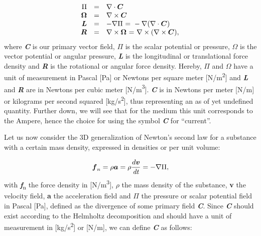 \documentclass[a4paper]{article}
\newcommand\textstyleNone[1]{#1}
\newcounter{Text}
\newcommand\boldsubformula[1]{\text{\mathversion{bold}$#1$}}
\begin{document}
\begin{equation}\label{seq:refText15}
\begin{matrix}\hfill \Pi &=&\nabla \cdot \boldsubformula C\hfill\null \\\hfill \boldsubformula{\Omega }&=&\nabla \times
\boldsubformula C\hfill\null \\\hfill \boldsubformula L&=&-\nabla \Pi \text{ = }-\nabla (\nabla \cdot \boldsubformula
C)\hfill\null \\\hfill \boldsubformula R&=&\nabla \times \boldsubformula{\Omega }\text{ = }\nabla \times (\nabla \times
\boldsubformula C),\hfill\null \end{matrix}
\end{equation}
{
\textstyleNone{{where
}\textbf{\textit{{C}}}{
}{is }{our
primary vector field}{,
}}\href{https://en.wikipedia.org/wiki/Pi_(letter)}{\textstyleNone{\textit{{$\Pi
$}}}}\textstyleNone{{ is
}{the}{ scalar
potential
}{or}{
pressure, }\textbf{\textit{{$\Omega $
}}}}{is the vector potential or angular pressure,
}\textbf{\textit{{L}}}{
is the longitudinal or translational force density and
}\textbf{\textit{{R}}}{
is the rotational or angular force density. Hereby,
}\href{https://en.wikipedia.org/wiki/Pi_(letter)}{\textstyleNone{\textit{{$\Pi
$}}}}\textstyleNone{{
}{and
}\textbf{\textit{{$\Omega
$}}}\textbf{\textit{{
}}}{have a unit of measurement in Pascal [Pa] or Newtons per square
meter
[N/m}{\textsuperscript{2}}{]
and
}\textbf{\textit{{L}}}{
and
}\textbf{\textit{{R}}}{
are in Newtons per cubic meter
[N/m}{\textsuperscript{3}}{].
}\textbf{\textit{{C}}}{
is in Newtons per meter [N/m] or kilograms per second squared
[kg/s}{\textsuperscript{2}}{],
thus representing an as of yet undefined quantity. }{Further down,
we will see that for the medium this unit corresponds to the Ampere, hence the choice for using the symbol
}\textbf{\textit{{C}}}{
}{for ``current''.}}}

{
\textstyleNone{{Let us now
}{consider
}{the 3D generalization of
}{Newton's second law
}{for a
}{substance}{
with a certain mass density}{, expressed in densities or per unit
volume:}}}

\begin{equation}
\boldsubformula f_n=\rho \boldsubformula a=\rho \frac{d\boldsubformula v}{\mathit{dt}}=-{\nabla}\Pi ,
\end{equation}
{
\textstyleNone{{with
}\textbf{\textit{{f}}}{\textsubscript{n}}{
}{the}{ force
density in
[N/m}{\textsuperscript{3}}{],}{
$\rho $ the mass density of the
}{substance}{,
}\textbf{{v}}{
the velocity field,
}\textbf{{a}}{
the acceleration field }{and $\Pi
$}{ the pressure
}{or}{ scalar
}potential field in Pascal [Pa], defined as the divergence of some primary field \textbf{\textit{C}}. Since
\textbf{\textit{C}} should exist according to the Helmholtz decomposition and should have a unit of measurement in
}[kg/s\textsuperscript{2}] or [N/m], we can define \textbf{\textit{C}} as follows:\textstyleNone{  }}
\end{document}
